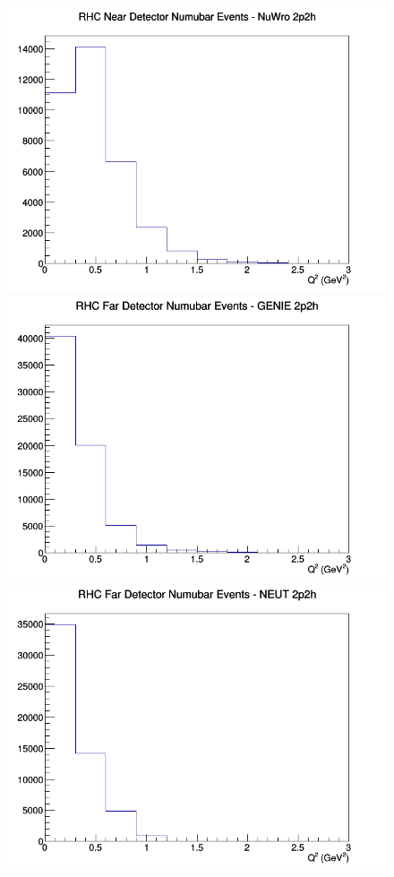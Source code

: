 \begin{figure}[h]
\includegraphics[width=\linewidth]{Q2/nominal/2p2h_RHC_ND_numubar_Q2_NuWro.png}
\endminipage
\newline
{}
\includegraphics[width=\linewidth]{Q2/nominal/2p2h_RHC_FD_numubar_Q2_GENIE.png}
\endminipage
{}
\includegraphics[width=\linewidth]{Q2/nominal/2p2h_RHC_FD_numubar_Q2_NEUT.png}

\end{figure}
